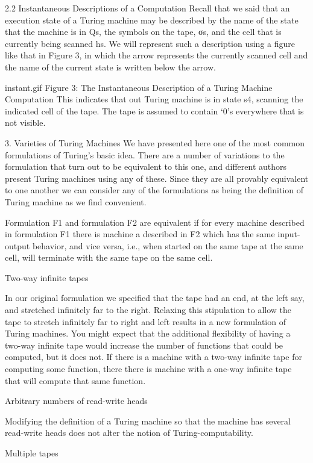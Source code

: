 2.2 Instantaneous Descriptions of a Computation
Recall that we said that an execution state of a Turing machine may be described by the name of the state that the machine is in Qs, the symbols on the tape, σs, and the cell that is currently being scanned hs. We will represent such a description using a figure like that in Figure 3, in which the arrow represents the currently scanned cell and the name of the current state is written below the arrow.

instant.gif 
Figure 3: The Instantaneous Description of a Turing Machine Computation
This indicates that out Turing machine is in state s4, scanning the indicated cell of the tape. The tape is assumed to contain ‘0’s everywhere that is not visible.

3. Varieties of Turing Machines
We have presented here one of the most common formulations of Turing's basic idea. There are a number of variations to the formulation that turn out to be equivalent to this one, and different authors present Turing machines using any of these. Since they are all provably equivalent to one another we can consider any of the formulations as being the definition of Turing machine as we find convenient.

Formulation F1 and formulation F2 are equivalent if for every machine described in formulation F1 there is machine a described in F2 which has the same input-output behavior, and vice versa, i.e., when started on the same tape at the same cell, will terminate with the same tape on the same cell.

Two-way infinite tapes

In our original formulation we specified that the tape had an end, at the left say, and stretched infinitely far to the right. Relaxing this stipulation to allow the tape to stretch infinitely far to right and left results in a new formulation of Turing machines. You might expect that the additional flexibility of having a two-way infinite tape would increase the number of functions that could be computed, but it does not. If there is a machine with a two-way infinite tape for computing some function, there there is machine with a one-way infinite tape that will compute that same function.

Arbitrary numbers of read-write heads

Modifying the definition of a Turing machine so that the machine has several read-write heads does not alter the notion of Turing-computability.

Multiple tapes

